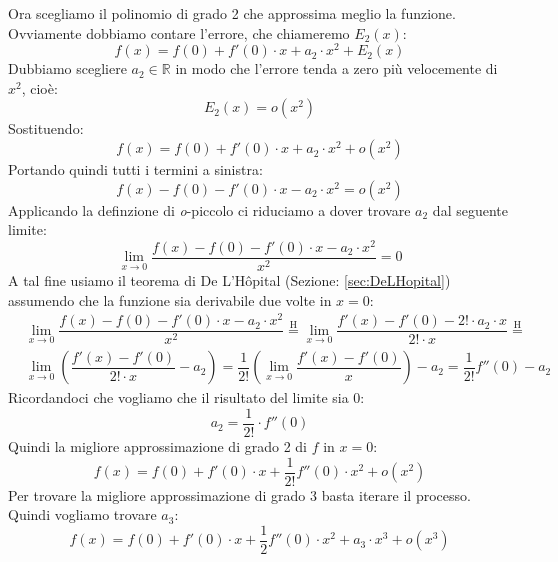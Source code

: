 Ora scegliamo il polinomio di grado 2 che approssima meglio la funzione. Ovviamente dobbiamo contare l'errore, che chiameremo $E_2(x)$:
\begin{equation*}
	f(x) = f(0) + f'(0) \cdot x + a_2 \cdot x^2 + E_2(x)
\end{equation*}
Dubbiamo scegliere $a_2 \in \mathbb{R}$ in modo che l'errore tenda a zero più velocemente di $x^2$, cioè:
\begin{equation*}
	E_2(x) = o(x^2)
\end{equation*}
Sostituendo:
\begin{equation*}
	f(x) = f(0) + f'(0) \cdot x + a_2 \cdot x^2 + o(x^2)
\end{equation*}
Portando quindi tutti i termini a sinistra:
\begin{equation*}
	f(x) - f(0) - f'(0) \cdot x - a_2 \cdot x^2 = o(x^2)
\end{equation*}
Applicando la definzione di \textit{o}-piccolo ci riduciamo a dover trovare $a_2$ dal seguente limite:
\begin{equation*}
	\lim_{x \to 0} \dfrac{f(x) - f(0) - f'(0) \cdot x - a_2 \cdot x^2}{x^2} = 0
\end{equation*}
A tal fine usiamo il teorema di De L'Hôpital (Sezione: \ref{sec:DeLHopital}) assumendo che la funzione sia derivabile due volte in $x = 0$:
\begin{align*}
	&\lim_{x \to 0} \dfrac{f(x) - f(0) - f'(0) \cdot x - a_2 \cdot x^2}{x^2} \stackrel{\text{H}}{=} \lim_{x \to 0} \dfrac{f'(x) - f'(0) - 2! \cdot a_2 \cdot x}{2! \cdot x} \stackrel{\text{H}}{=}\\[10pt]
	&\lim_{x \to 0} \left(\dfrac{f'(x) - f'(0)}{2! \cdot x} - a_2\right) = \dfrac{1}{2!} \left(\lim_{x \to 0} \dfrac{f'(x) - f'(0)}{x} \right) - a_2 =  \dfrac{1}{2!} f''(0) - a_2
\end{align*}
Ricordandoci che vogliamo che il risultato del limite sia 0:
\begin{equation*}
	a_2 = \dfrac{1}{2!} \cdot f''(0)
\end{equation*}
Quindi la migliore approssimazione di grado 2 di $f$ in $x = 0$:
\begin{equation*}
	f(x) = f(0) + f'(0) \cdot x + \dfrac{1}{2!} f''(0) \cdot x^2 + o(x^2)
\end{equation*}
Per trovare la migliore approssimazione di grado 3 basta iterare il processo. Quindi vogliamo trovare $a_3$:
\begin{equation*}
	f(x) = f(0) + f'(0) \cdot x + \dfrac{1}{2} f''(0) \cdot x^2 + a_3 \cdot x^3 + o(x^3)
\end{equation*}
